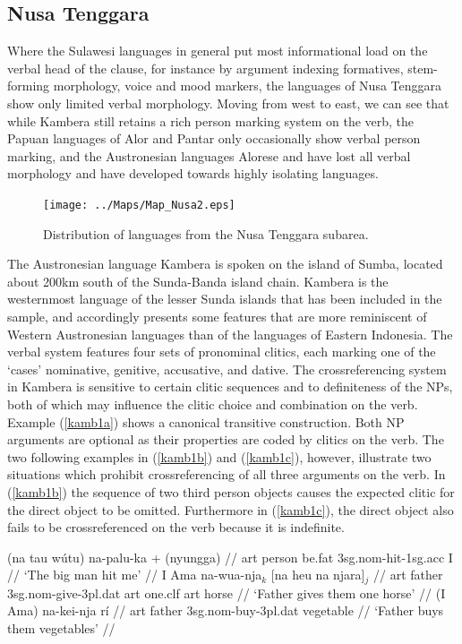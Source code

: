 \subsection{Nusa Tenggara} \label{sec:nus}

Where the Sulawesi languages in general put most informational load on the verbal head of the clause, for instance by argument indexing formatives, stem-forming morphology, voice and mood markers, the languages of Nusa Tenggara show only limited verbal morphology. Moving from west to east, we can see that while Kambera still retains a rich person marking system on the verb, the Papuan languages of Alor and Pantar only occasionally show verbal person marking, and the Austronesian languages Alorese and  have lost all verbal morphology and have developed towards highly isolating languages.

\begin{figure}
\begin{center}
\texttt{[image: ../Maps/Map\_Nusa2.eps]}
\caption{Distribution of languages from the Nusa Tenggara subarea.}\label{map:Nus}
\end{center}
\end{figure}  

The Austronesian language Kambera is spoken on the island of Sumba, located about 200km south of the Sunda-Banda island chain. Kambera is the westernmost language of the lesser Sunda islands that has been included in the sample, and accordingly presents some features that are more reminiscent of Western Austronesian languages than of the languages of Eastern Indonesia. The verbal system features four sets of pronominal clitics, each marking one of the `cases' nominative, genitive, accusative, and dative. The crossreferencing system in Kambera is sensitive to certain clitic sequences and to definiteness of the NPs, both of which may influence the clitic choice and combination on the verb. Example (\ref{kamb1a}) shows a canonical transitive construction. Both NP arguments are optional as their properties are coded by clitics on the verb. The two following examples in (\ref{kamb1b}) and (\ref{kamb1c}), however, illustrate two situations which prohibit crossreferencing of all three arguments on the verb. In (\ref{kamb1b}) the sequence of two third person objects causes the expected clitic for the direct object to be omitted. Furthermore in (\ref{kamb1c}), the direct object also fails to be crossreferenced on the verb because it is indefinite.

\pex 
\a \label{kamb1a}
\begingl[glhangstyle=none]
\gla (na tau wútu) na-palu-ka + (nyungga) // 
\glb \acs{art} person be.fat \acs{3}\acs{sg}.\acs{nom}-hit-\acs{1}\acs{sg}.\acs{acc} I //
\glft `The big man hit me' // 
\endgl
\a \label{kamb1b}
\begingl
\gla I Ama na-wua-nja$_k$ [na heu na njara]$_j$ //
\glb \acs{art} father \acs{3}\acs{sg}.\acs{nom}-give-\acs{3}\acs{pl}.\acs{dat} \acs{art} one.\acs{clf} \acs{art} horse //
\glft `Father gives them one horse' // 
\endgl
\a \label{kamb1c}
\begingl
\gla (I Ama) na-kei-nja rí // 
\glb \acs{art} father \acs{3}\acs{sg}.\acs{nom}-buy-\acs{3}\acs{pl}.\acs{dat} vegetable //
\glft `Father buys them vegetables' // 
\endgl
\xe

